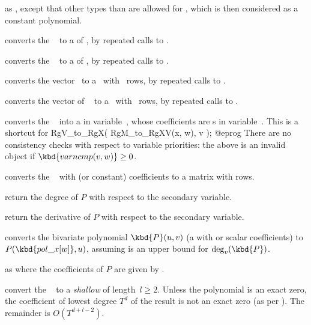  as , except that other
types than  are allowed for , which is then considered as a
constant polynomial.

 converts the ~ to a
 of , by repeated calls to .

 converts the ~
to a  of , by repeated calls to .

 converts the vector~ to
a~ with ~rows, by repeated calls to .

 converts the vector of ~
to a~ with ~rows, by repeated calls to .

 converts the ~ into
a  in variable~, whose coefficients are s in
variable~. This is a shortcut for
\bprog
  RgV_to_RgX( RgM_to_RgXV(x, w), v );
@eprog\noindent
There are no consistency checks with respect to variable
priorities: the above is an invalid object if $\kbd{varncmp(v, w)} \geq 0$.

 converts the ~ with
 (or constant) coefficients to a matrix with  rows.

 return the degree of $P$ with respect to
the secondary variable.

 return the derivative of $P$ with respect to
the secondary variable.

 converts the bivariate polynomial
$\kbd{P}(u,v)$ (a  with  or scalar coefficients) to
$P(\kbd{pol\_x[w]},u)$, assuming  is an upper bound for
$\deg_v(\kbd{P})$.

as  where the coefficients of $P$ are given by
.

 convert the ~ to
a \emph{shallow}  of length~$l\geq 2$.
Unless the polynomial is an exact zero, the coefficient of lowest degree
$T^d$ of the result is not an exact zero (as per ). The
remainder is $O(T^{d+l-2})$.

